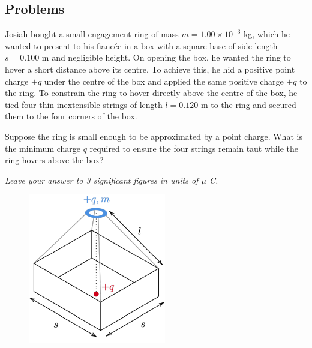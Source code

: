 \subsection*{Problems}
\begin{prbm}
Josiah bought a small engagement ring of mass $m = 1.00 \times 10^{-3}$ \unit{kg}, which he wanted to present to his fianc\'{e}e in a box with a square base of side length $s = 0.100$ \unit{m} and negligible height. On opening the box, he wanted the ring to hover a short distance above its centre. To achieve this, he hid a positive point charge $+q$ under the centre of the box and applied the same positive charge $+q$ to the ring. To constrain the ring to hover directly above the centre of the box, he tied four thin inextensible strings of length $l = 0.120$ \unit{m} to the ring and secured them to the four corners of the box. 

Suppose the ring is small enough to be approximated by a point charge. What is the minimum charge $q$ required to ensure the four strings remain taut while the ring hovers above the box?

\textit{Leave your answer to 3 significant figures in units of $\mu$ \unit{C}.}

\begin{figure}[H]
    \centering
    \includegraphics[width=6cm]{images/A_Simple_Proposal.png}
\end{figure}
\end{prbm}

